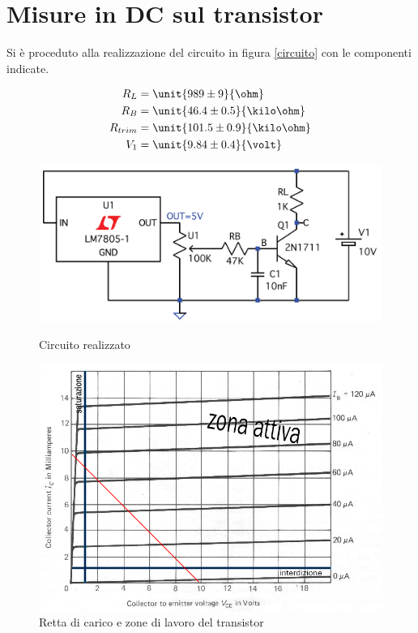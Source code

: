 \documentclass[10pt,a4paper]{article}
\begin{document}
\section{Misure in DC sul transistor}
Si è proceduto alla realizzazione del circuito in figura \figurename{\ref{circuito}} con le componenti indicate.
\begin{figure}[h!]
\begin{minipage}[c]{0.25\textwidth}
\begin{align*}
R_L &= \unit{989 \pm 9}{\ohm}\\
R_B &= \unit{46.4 \pm 0.5}{\kilo\ohm}\\
R_{trim} &= \unit{101.5 \pm 0.9}{\kilo \ohm}\\
V_1 &= \unit{9.84 \pm 0.4}{\volt}\\
\end{align*}
	\end{minipage}
	\begin{minipage}[c]{0.3\textwidth}
	\centering
	\includegraphics[width=1\textwidth]{../grafici/circuito.png}
	\caption{Circuito realizzato}
	\label{circuito}
	\end{minipage}
	\begin{minipage}[c]{0.45\textwidth}
		\centering
		\includegraphics[width=1.1\textwidth]{../grafici/retta_carico.png}
		\caption{Retta di carico e zone di lavoro del transistor}
		\label{retta_carico}
	\end{minipage}
\end{figure}
\end{document}
